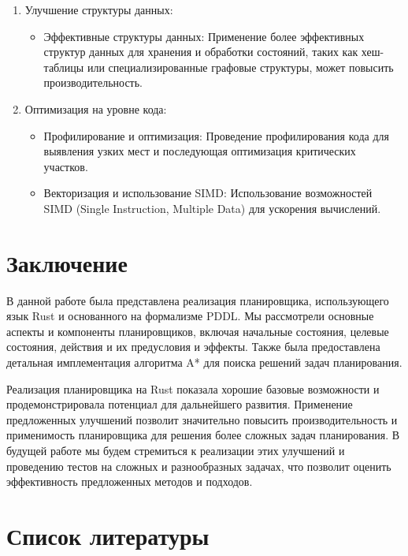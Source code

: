 \documentclass{article}
\begin{document}
\begin{enumerate}
  \item Улучшение структуры данных:
    \begin{itemize}
      \item Эффективные структуры данных: Применение более эффективных структур данных для хранения и обработки состояний, таких как хеш-таблицы или специализированные графовые структуры, может повысить производительность.
    \end{itemize}

  \item Оптимизация на уровне кода:
    \begin{itemize}
      \item Профилирование и оптимизация: Проведение профилирования кода для выявления узких мест и последующая оптимизация критических участков.
      \item Векторизация и использование SIMD: Использование возможностей SIMD (Single Instruction, Multiple Data) для ускорения вычислений.
    \end{itemize}
\end{enumerate}

\section{Заключение}

В данной работе была представлена реализация планировщика,
использующего язык Rust и основанного на формализме PDDL.
Мы рассмотрели основные аспекты и компоненты планировщиков,
включая начальные состояния, целевые состояния, действия и их предусловия и эффекты.
Также была предоставлена детальная имплементация алгоритма A* для поиска решений задач планирования.

Реализация планировщика на Rust показала хорошие базовые возможности 
и продемонстрировала потенциал для дальнейшего развития.
Применение предложенных улучшений позволит значительно повысить производительность
и применимость планировщика для решения более сложных задач планирования.
В будущей работе мы будем стремиться к реализации этих улучшений
и проведению тестов на сложных и разнообразных задачах,
что позволит оценить эффективность предложенных методов и подходов.

\newpage

\section{Список литературы}
\printbibliography [heading=none]
\end{document}
